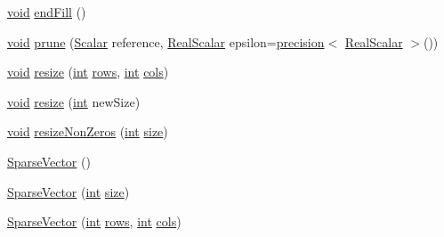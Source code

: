 \begin{DoxyCompactItemize}
\hyperlink{group___u_a_v_objects_plugin_ga444cf2ff3f0ecbe028adce838d373f5c}{void} \hyperlink{class_sparse_vector_a36f11b5cbedb37dc71965c2b0309a6e6}{end\-Fill} ()
\item 
\hyperlink{group___u_a_v_objects_plugin_ga444cf2ff3f0ecbe028adce838d373f5c}{void} \hyperlink{class_sparse_vector_a832b7aca57e91eeff4aeff21f5371e26}{prune} (\hyperlink{class_sparse_matrix_base_af39d70f2b7e775e9e17b666cd24128c8}{Scalar} reference, \hyperlink{class_sparse_matrix_base_a615d56082efd03b5f31015cc4900e72f}{Real\-Scalar} epsilon=\hyperlink{_math_functions_8h_a3dc1c65cf9dc9b5a7ee66472d0ae83e1}{precision}$<$ \hyperlink{class_sparse_matrix_base_a615d56082efd03b5f31015cc4900e72f}{Real\-Scalar} $>$())
\item 
\hyperlink{group___u_a_v_objects_plugin_ga444cf2ff3f0ecbe028adce838d373f5c}{void} \hyperlink{class_sparse_vector_a2e48979d67bdd4d59d20c24505cd49ac}{resize} (\hyperlink{ioapi_8h_a787fa3cf048117ba7123753c1e74fcd6}{int} \hyperlink{class_sparse_vector_a56b354dffd1a51cb0d896f66f1160fe3}{rows}, \hyperlink{ioapi_8h_a787fa3cf048117ba7123753c1e74fcd6}{int} \hyperlink{class_sparse_vector_ac1a576a10b7ba8d64453dd015502a4ad}{cols})
\item 
\hyperlink{group___u_a_v_objects_plugin_ga444cf2ff3f0ecbe028adce838d373f5c}{void} \hyperlink{class_sparse_vector_a011ae8ce9573abf1d495665609a1e8bb}{resize} (\hyperlink{ioapi_8h_a787fa3cf048117ba7123753c1e74fcd6}{int} new\-Size)
\item 
\hyperlink{group___u_a_v_objects_plugin_ga444cf2ff3f0ecbe028adce838d373f5c}{void} \hyperlink{class_sparse_vector_adad21f802ccc4e14855685ee599f36aa}{resize\-Non\-Zeros} (\hyperlink{ioapi_8h_a787fa3cf048117ba7123753c1e74fcd6}{int} \hyperlink{glext_8h_a014d89bd76f74ef3a29c8f04b473eb76}{size})
\item 
\hyperlink{class_sparse_vector_acf782d828ce7a1412f0cde5e20660349}{Sparse\-Vector} ()
\item 
\hyperlink{class_sparse_vector_a0c07032b21cb80a21d41c2de97ea58a7}{Sparse\-Vector} (\hyperlink{ioapi_8h_a787fa3cf048117ba7123753c1e74fcd6}{int} \hyperlink{glext_8h_a014d89bd76f74ef3a29c8f04b473eb76}{size})
\item 
\hyperlink{class_sparse_vector_a1b4dbdd961bfd67b9361e4ee3ccd2f9e}{Sparse\-Vector} (\hyperlink{ioapi_8h_a787fa3cf048117ba7123753c1e74fcd6}{int} \hyperlink{class_sparse_vector_a56b354dffd1a51cb0d896f66f1160fe3}{rows}, \hyperlink{ioapi_8h_a787fa3cf048117ba7123753c1e74fcd6}{int} \hyperlink{class_sparse_vector_ac1a576a10b7ba8d64453dd015502a4ad}{cols})
\item 

\end{DoxyCompactItemize}
